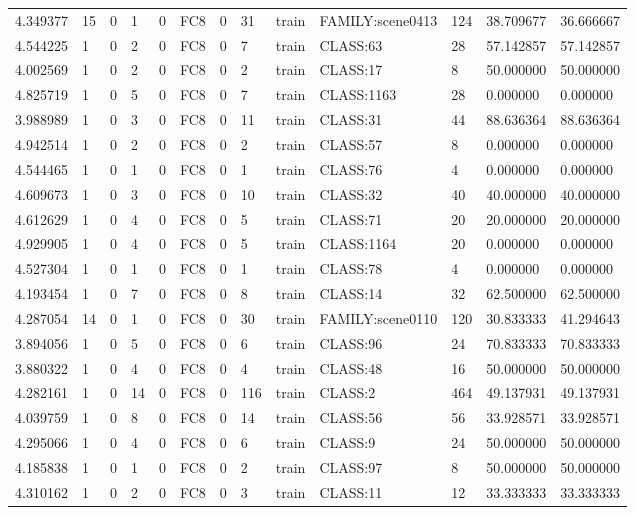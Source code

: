 \begin{tabular}{lllllllllllll}
4.349377 & 15 & 0 & 1 & 0 & FC8 & 0 & 31 & train & FAMILY:scene0413 & 124 & 38.709677 & 36.666667 \\
4.544225 & 1 & 0 & 2 & 0 & FC8 & 0 & 7 & train & CLASS:63 & 28 & 57.142857 & 57.142857 \\
4.002569 & 1 & 0 & 2 & 0 & FC8 & 0 & 2 & train & CLASS:17 & 8 & 50.000000 & 50.000000 \\
4.825719 & 1 & 0 & 5 & 0 & FC8 & 0 & 7 & train & CLASS:1163 & 28 & 0.000000 & 0.000000 \\
3.988989 & 1 & 0 & 3 & 0 & FC8 & 0 & 11 & train & CLASS:31 & 44 & 88.636364 & 88.636364 \\
4.942514 & 1 & 0 & 2 & 0 & FC8 & 0 & 2 & train & CLASS:57 & 8 & 0.000000 & 0.000000 \\
4.544465 & 1 & 0 & 1 & 0 & FC8 & 0 & 1 & train & CLASS:76 & 4 & 0.000000 & 0.000000 \\
4.609673 & 1 & 0 & 3 & 0 & FC8 & 0 & 10 & train & CLASS:32 & 40 & 40.000000 & 40.000000 \\
4.612629 & 1 & 0 & 4 & 0 & FC8 & 0 & 5 & train & CLASS:71 & 20 & 20.000000 & 20.000000 \\
4.929905 & 1 & 0 & 4 & 0 & FC8 & 0 & 5 & train & CLASS:1164 & 20 & 0.000000 & 0.000000 \\
4.527304 & 1 & 0 & 1 & 0 & FC8 & 0 & 1 & train & CLASS:78 & 4 & 0.000000 & 0.000000 \\
4.193454 & 1 & 0 & 7 & 0 & FC8 & 0 & 8 & train & CLASS:14 & 32 & 62.500000 & 62.500000 \\
4.287054 & 14 & 0 & 1 & 0 & FC8 & 0 & 30 & train & FAMILY:scene0110 & 120 & 30.833333 & 41.294643 \\
3.894056 & 1 & 0 & 5 & 0 & FC8 & 0 & 6 & train & CLASS:96 & 24 & 70.833333 & 70.833333 \\
3.880322 & 1 & 0 & 4 & 0 & FC8 & 0 & 4 & train & CLASS:48 & 16 & 50.000000 & 50.000000 \\
4.282161 & 1 & 0 & 14 & 0 & FC8 & 0 & 116 & train & CLASS:2 & 464 & 49.137931 & 49.137931 \\
4.039759 & 1 & 0 & 8 & 0 & FC8 & 0 & 14 & train & CLASS:56 & 56 & 33.928571 & 33.928571 \\
4.295066 & 1 & 0 & 4 & 0 & FC8 & 0 & 6 & train & CLASS:9 & 24 & 50.000000 & 50.000000 \\
4.185838 & 1 & 0 & 1 & 0 & FC8 & 0 & 2 & train & CLASS:97 & 8 & 50.000000 & 50.000000 \\
4.310162 & 1 & 0 & 2 & 0 & FC8 & 0 & 3 & train & CLASS:11 & 12 & 33.333333 & 33.333333 \\

\end{tabular}
